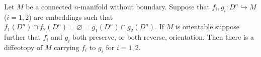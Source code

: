 Let $M$ be a connected $n$-manifold without boundary. Suppose that $f_i, g_i: D^n \hookrightarrow M$ ($i = 1, 2$) are embeddings such that $f_1(D^n) \cap f_2(D^n) = \varnothing = g_1(D^n) \cap g_2(D^n)$. If $M$ is orientable suppose further that $f_i$ and $g_i$ both preserve, or both reverse, orientation. Then there is a diffeotopy of $M$ carrying $f_i$ to $g_i$ for $i = 1, 2$.
